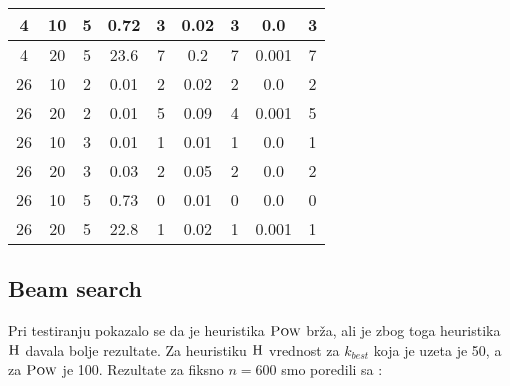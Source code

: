 \documentclass{article}
\begin{document}
\begin{center}
\begin{tabular}{| c c c | c c | c c | c c |}
            \hline
            4          & 10  & 5   & 0.72   & 3          & 0.02   & 3          & 0.0    & 3          \\
            \hline
            4          & 20  & 5   & 23.6   & 7          & 0.2    & 7          & 0.001  & 7          \\
            \hline
            26         & 10  & 2   & 0.01   & 2          & 0.02   & 2          & 0.0    & 2          \\
            \hline
            26         & 20  & 2   & 0.01   & 5          & 0.09   & 4          & 0.001  & 5          \\
            \hline
            26         & 10  & 3   & 0.01   & 1          & 0.01   & 1          & 0.0    & 1          \\
            \hline
            26         & 20  & 3   & 0.03   & 2          & 0.05   & 2          & 0.0    & 2          \\
            \hline
            26         & 10  & 5   & 0.73   & 0          & 0.01   & 0          & 0.0    & 0          \\
            \hline
            26         & 20  & 5   & 22.8   & 1          & 0.02   & 1          & 0.001  & 1          \\
            \hline
        \end{tabular}
    \end{center}

    \pagebreak

    \subsection{Beam search}
    Pri testiranju pokazalo se da je heuristika $\textsc{Pow}$ brža, ali je zbog toga heuristika $\textsc{H}$ davala bolje rezultate. Za heuristiku $\textsc{H}$ vrednost za $k_{best}$ koja je uzeta je 50, a za $\textsc{Pow}$ je 100. Rezultate za fiksno $n=600$ smo poredili sa \cite{res}:
\end{document}
